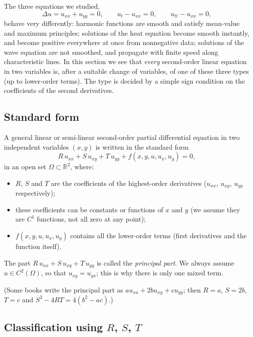 \documentclass[11pt]{article}
\theoremstyle{plain}
\theoremstyle{definition}
\theoremstyle{remark}
\begin{document}
The three equations we studied,
$$ \Delta u = u_{xx} + u_{yy} = 0, \qquad u_t - u_{xx} = 0, \qquad u_{tt} - u_{xx} = 0, $$
behave very differently: harmonic functions are smooth and satisfy mean-value and maximum principles; solutions of the heat equation become smooth instantly, and become positive everywhere at once from nonnegative data; solutions of the wave equation are not smoothed, and propagate with finite speed along characteristic lines. In this section we see that \emph{every} second-order linear equation in two variables is, after a suitable change of variables, of one of these three types (up to lower-order terms). The type is decided by a simple sign condition on the coefficients of the second derivatives.

\subsection{Standard form}

A general linear or semi-linear second-order partial differential equation in two independent variables $(x,y)$ is written in the standard form
\begin{equation}\label{eq:pde2}
R\,u_{xx} + S\,u_{xy} + T\,u_{yy} + f(x,y,u,u_x,u_y) = 0,
\end{equation}
in an open set $\Omega \subset \mathbb{R}^2$, where:
\begin{itemize}
    \item $R$, $S$ and $T$ are the coefficients of the highest-order derivatives ($u_{xx}$, $u_{xy}$, $u_{yy}$ respectively);
    \item these coefficients can be constants or functions of $x$ and $y$ (we assume they are $C^1$ functions, not all zero at any point);
    \item $f(x,y,u,u_x,u_y)$ contains all the lower-order terms (first derivatives and the function itself).
\end{itemize}
The part $R\,u_{xx} + S\,u_{xy} + T\,u_{yy}$ is called the \emph{principal part}. We always assume $u \in C^2(\Omega)$, so that $u_{xy} = u_{yx}$; this is why there is only one mixed term.

(Some books write the principal part as $a u_{xx} + 2b u_{xy} + c u_{yy}$; then $R = a$, $S = 2b$, $T = c$ and $S^2 - 4RT = 4(b^2 - ac)$.)

\subsection{Classification using $R$, $S$, $T$}
\end{document}
